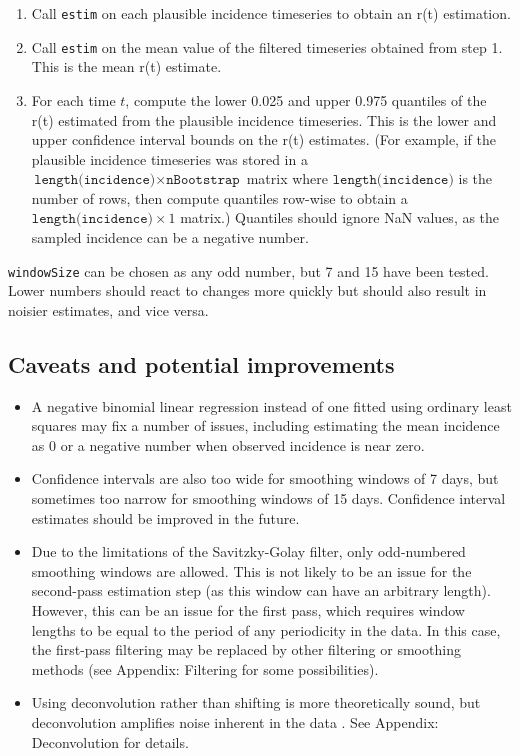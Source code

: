 \documentclass{article}
\newcommand{\code}[1]{\texttt{#1}}
\begin{document}
\begin{enumerate}
	\item Call \code{estim} on each plausible incidence timeseries to obtain an r(t) estimation. 
	
	\item Call \code{estim} on the mean value of the filtered timeseries obtained from step 1. This is the mean r(t) estimate.
	
	\item For each time $t$, compute the lower 0.025 and upper 0.975 quantiles of the r(t) estimated from the plausible incidence timeseries. This is the lower and upper confidence interval bounds on the r(t) estimates. (For example, if the plausible incidence timeseries was stored in a $\code{length(incidence)} \times \code{nBootstrap}$ matrix where $\code{length(incidence)}$ is the number of rows, then compute quantiles row-wise to obtain a $\code{length(incidence)} \times 1$ matrix.) Quantiles should ignore NaN values, as the sampled incidence can be a negative number. 
\end{enumerate}

\code{windowSize} can be chosen as any odd number, but 7 and 15 have been tested. Lower numbers should react to changes more quickly but should also result in noisier estimates, and vice versa.

\subsection{Caveats and potential improvements}
\begin{itemize}
	\item A negative binomial linear regression instead of one fitted using ordinary least squares may fix a number of issues, including estimating the mean incidence as 0 or a negative number when observed incidence is near zero. 
	\item Confidence intervals are also too wide for smoothing windows of 7 days, but sometimes too narrow for smoothing windows of 15 days. Confidence interval estimates should be improved in the future.
	\item Due to the limitations of the Savitzky-Golay filter, only odd-numbered smoothing windows are allowed. This is not likely to be an issue for the second-pass estimation step (as this window can have an arbitrary length). However, this can be an issue for the first pass, which requires window lengths to be equal to the period of any periodicity in the data. In this case, the first-pass filtering may be replaced by other filtering or smoothing methods (see Appendix: Filtering  for some possibilities). 
	
	\item Using deconvolution rather than shifting is more theoretically sound, but deconvolution amplifies noise inherent in the data \cite{Gostic} \cite{RLLoss}. See Appendix: Deconvolution for details.
\end{itemize}
\end{document}
